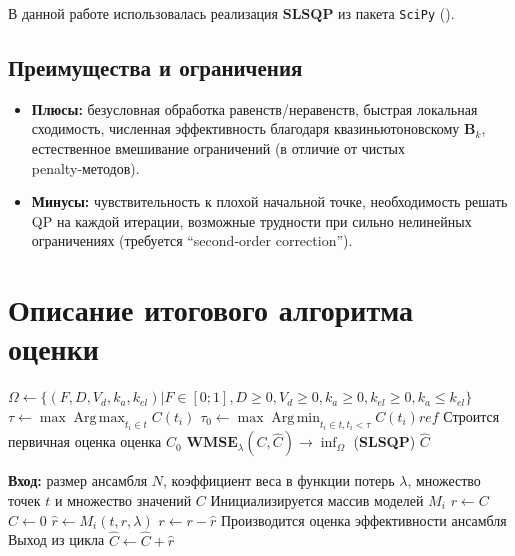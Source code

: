 \documentclass[oneside,senior,etd]{BYUPhys}
\DeclareMathOperator*{\Argmax}{Arg\,max}
\DeclareMathOperator*{\Argmin}{Arg\,min}
\begin{document}
В данной работе использовалась реализация $\textbf{SLSQP}$ из пакета \texttt{SciPy} (\cite{scipy}).

\subsection{Преимущества и ограничения}
\begin{itemize}
	\item \textbf{Плюсы:}
	      безусловная обработка равенств/неравенств, быстрая локальная сходимость, численная эффективность благодаря квазиньютоновскому $\bm B_k$, естественное вмешивание ограничений (в отличие от чистых penalty‑методов).
	\item \textbf{Минусы:}
	      чувствительность к плохой начальной точке, необходимость решать QP на каждой итерации, возможные трудности при сильно нелинейных ограничениях (требуется “second‑order correction”).
\end{itemize}

\newpage

\section{Описание итогового алгоритма оценки}
\begin{algorithm}
	\caption{Алгоритм оценки траектории}\label{ensemble_alg}
	\begin{algorithmic}[1]
		\State $\Omega \gets \{ (F, D, V_d, k_a, k_{el}) | F \in [0; 1], D \ge 0, V_d \ge 0, k_a \ge 0, k_{el} \ge 0, k_a \le k_{el}\}$
		\State $\tau \gets \max \Argmax_{t_i \in t} C(t_i)$
		\State $\tau_0 \gets \max \Argmin_{t_i \in t, t_i < \tau} C(t_i)ref$
		\State Строится первичная оценка оценка $\hat{C}_0$
		\State $\textbf{WMSE}_{\lambda} (C, \hat{C}) \to \inf_{\Omega}$ (\textbf{SLSQP})
		\State \Return $\hat{C}$
		\EndProcedure

		\State \textbf{Вход:} размер ансамбля $N$, коэффициент веса в функции потерь $\lambda$, множество точек $t$ и множество значений $C$
		\State Инициализируется массив моделей $M_i$
		\State $r \gets C$
		\State $\hat{C} \gets 0$
		\State $\hat{r} \gets M_i (t, r, \lambda)$
		\State $r \gets r - \hat{r}$
		\State Производится оценка эффективности ансамбля
		\State Выход из цикла
		\EndIf
		\State $\hat{C} \gets \hat{C} + \hat{r}$
		\EndFor
	\end{algorithmic}
\end{algorithm}
\end{document}
